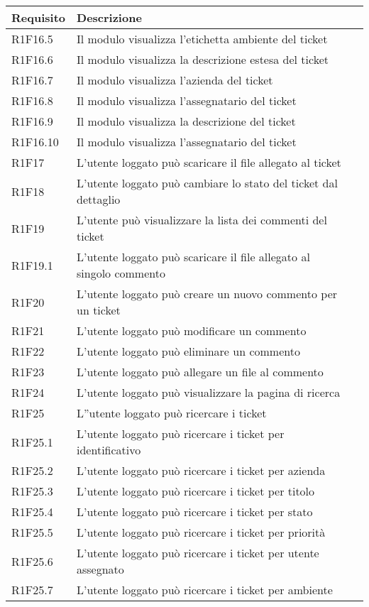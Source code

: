 \begin{table}[H]
{\renewcommand{\arraystretch}{2}
\begin{tabularx}{\textwidth}{lXl}
\hline\hline
\textbf{Requisito} & \textbf{Descrizione}\\
\hline

R1F16.5 & Il modulo visualizza l'etichetta ambiente del ticket\\
\hline
R1F16.6 & Il modulo visualizza la descrizione estesa del ticket\\
\hline
R1F16.7 & Il modulo visualizza l'azienda del ticket\\
\hline
R1F16.8 & Il modulo visualizza l'assegnatario del ticket\\
\hline
R1F16.9 & Il modulo visualizza la descrizione del ticket\\
\hline
R1F16.10 & Il modulo visualizza l'assegnatario del ticket\\
\hline
R1F17 & L'utente loggato può scaricare il file allegato al ticket\\
\hline
R1F18 & L'utente loggato può cambiare lo stato del ticket dal dettaglio\\
\hline
R1F19 & L'utente può visualizzare la lista dei commenti del ticket\\
\hline
R1F19.1 & L'utente loggato può scaricare il file allegato al singolo commento\\
\hline
R1F20 & L'utente loggato può creare un nuovo commento per un ticket\\
\hline
R1F21 & L'utente loggato può modificare un commento\\
\hline
R1F22 & L'utente loggato può eliminare un commento\\
\hline
R1F23 & L'utente loggato può allegare un file al commento\\
\hline
R1F24 & L'utente loggato può visualizzare la pagina di ricerca\\
\hline

R1F25 & L''utente loggato può ricercare i ticket\\
\hline
R1F25.1 & L'utente loggato può ricercare i ticket per identificativo\\
\hline
R1F25.2 & L'utente loggato può ricercare i ticket per azienda\\
\hline
R1F25.3 & L'utente loggato può ricercare i ticket per titolo\\
\hline
R1F25.4 & L'utente loggato può ricercare i ticket per stato\\
\hline
R1F25.5 & L'utente loggato può ricercare i ticket per priorità\\
\hline
R1F25.6 & L'utente loggato può ricercare i ticket per utente assegnato\\
\hline
R1F25.7 & L'utente loggato può ricercare i ticket per ambiente\\
\hline
\end{tabularx}
}
\end{table}

